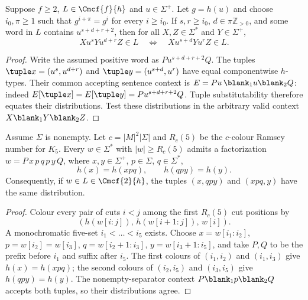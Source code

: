 \begin{lemma}
\label{lem:mcfg-power-transfer}
Suppose $f\ge2$, $L\in\Cmcf{f}{h}$ and $u\in\Sigma^+$.
Let $g=h(u)$ and choose $i_0,\pi\ge1$ such that
$g^{i+\pi}=g^i$ for every $i\ge i_0$.
If $s,r\ge i_0$, $d\in\pi\mathbb Z_{>0}$, and some
word in $L$ contains $u^{s+d+r+2}$, then for
all $X,Z\in\Sigma^*$ and $Y\in\Sigma^+$,
\[
 Xu^sYu^{d+r}Z\in L
 \quad\Longleftrightarrow\quad
 Xu^{s+d}Yu^rZ\in L.
\]
\end{lemma}
\begin{proof}
Write the assumed positive word as $Pu^{s+d+r+2}Q$.
The tuples $\tuple x=(u^s,u^{d+r})$ and
$\tuple y=(u^{s+d},u^r)$ have equal componentwise
$h$-types.  Their common accepting sentence context
is $E=Pu\,\blank_1u\blank_2Q$: indeed
$E[\tuple x]=E[\tuple y]=Pu^{s+d+r+2}Q$.
Tuple substitutability therefore equates their
distributions.  Test these distributions in the
arbitrary valid context $X\blank_1Y\blank_2Z$.
\end{proof}

\begin{lemma}
\label{lem:mcfg-local-shift}
Assume $\Sigma$ is nonempty. Let $c=|M|^2|\Sigma|$
and $R_c(5)$ be the
$c$-colour Ramsey number for $K_5$.
Every $w\in\Sigma^*$ with $|w|\ge R_c(5)$
admits a factorization
$w=P\,x\,p\,q\,p\,y\,Q$,
where $x,y\in\Sigma^+$, $p\in\Sigma$, $q\in\Sigma^*$,
\[
 h(x)=h(xpq),\qquad h(qpy)=h(y).
\]
Consequently, if $w\in L\in\Cmcf{2}{h}$, the tuples
$(x,qpy)$ and $(xpq,y)$ have the same distribution.
\end{lemma}
\begin{proof}
Colour every pair of cuts $i<j$ among the first
$R_c(5)$ cut positions by
\[
 (h(w[i:j]),\,h(w[i+1:j]),\,w[i]).
\]
A monochromatic five-set $i_1<\dots<i_5$ exists.
Choose $x=w[i_1:i_2]$, $p=w[i_2]=w[i_3]$,
$q=w[i_2+1:i_3]$,
$y=w[i_3+1:i_5]$, and take $P,Q$ to be
the prefix before $i_1$ and suffix after $i_5$.
The first colours of $(i_1,i_2)$ and $(i_1,i_3)$
give $h(x)=h(xpq)$; the second colours of
$(i_2,i_5)$ and $(i_3,i_5)$ give $h(qpy)=h(y)$.
The nonempty-separator context
$P\blank_1p\blank_2Q$ accepts both tuples,
so their distributions agree.
\end{proof}


